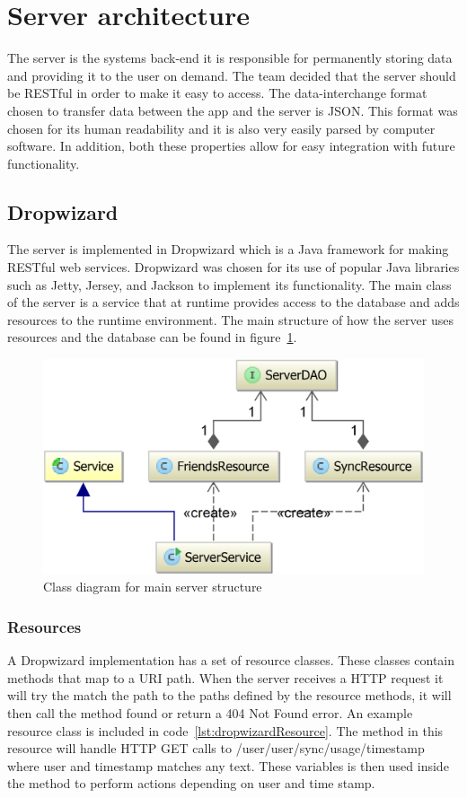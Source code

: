 \section{Server architecture}
\label{sec:arch_server}
The server is the systems back-end it is responsible for permanently storing data and providing it to the user on demand. The team decided that the server should be RESTful in order to make it easy to access. The data-interchange format chosen to transfer data between the app and the server is JSON. This format was chosen for its human readability and it is also very easily parsed by computer software. In addition, both these properties allow for easy integration with future functionality.

\subsection{Dropwizard}
The server is implemented in Dropwizard which is a Java framework for making RESTful web services. Dropwizard was chosen for its use of popular Java libraries such as Jetty, Jersey, and Jackson to implement its functionality. The main class of the server is a service that at runtime provides access to the database and adds resources to the runtime environment. The main structure of how the server uses resources and the database can be found in figure~\ref{fig:classDiagramServer}.

\begin{figure}[H]
\includegraphics[width=\textwidth]{ch/architecture/fig/classDiagramServer.png}
\caption{Class diagram for main server structure}
\label{fig:classDiagramServer}
\end{figure}

\subsubsection{Resources}
A Dropwizard implementation has a set of resource classes. These classes contain methods that map to a URI path. When the server receives a HTTP request it will try the match the path to the paths defined by the resource methods, it will then call the method found or return a 404 Not Found error. An example resource class is included in code~\ref{lst:dropwizardResource}. The method in this resource will handle HTTP GET calls to /user/{user}/sync/usage/{timestamp} where {user} and {timestamp} matches any text. These variables is then used inside the method to perform actions depending on user and time stamp.

